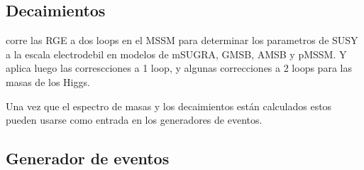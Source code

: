 

\subsection{Decaimientos}




{\suspect} corre las RGE a dos loops en el MSSM para determinar
los parametros de SUSY a la escala electrodebil en modelos de mSUGRA, GMSB, AMSB
y pMSSM. Y aplica luego las correscciones a 1 loop, y algunas correcciones a 2 loops
para las masas de los Higgs.



\vsp

Una vez que el espectro de masas y los decaimientos están calculados estos
pueden usarse como entrada en los generadores de eventos.




\subsection{Generador de eventos}

